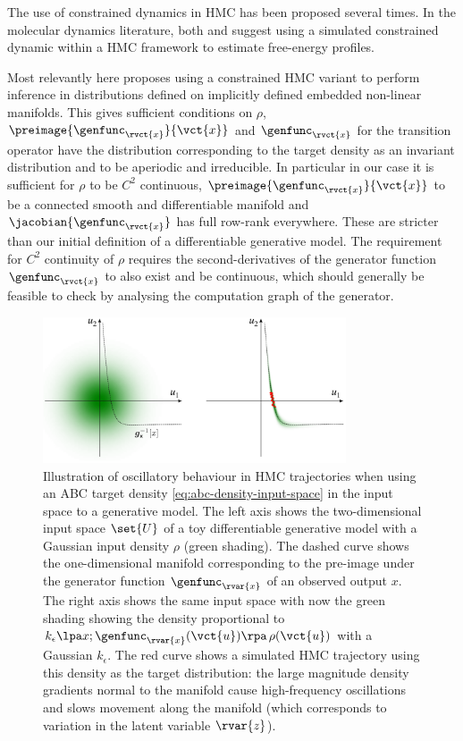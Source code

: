 The use of constrained dynamics in \ac{HMC} has been proposed several times. In the molecular dynamics literature, both \citep{hartmann2005constrained} and \citep{lelievre2012langevin} suggest using a simulated constrained dynamic within a \ac{HMC} framework to estimate free-energy profiles.

Most relevantly here \citep{brubaker2012family} proposes using a constrained \ac{HMC} variant to perform inference in distributions defined on implicitly defined embedded non-linear manifolds. This gives sufficient conditions on $\rho$, $\preimage{\genfunc_{\rvct{x}}}{\vct{x}}$ and $\genfunc_{\rvct{x}}$ for the transition operator have the distribution corresponding to the target density as an invariant distribution and to be aperiodic and irreducible. In particular in our case it is sufficient for $\rho$ to be $C^2$ continuous, $\preimage{\genfunc_{\rvct{x}}}{\vct{x}}$ to be a connected smooth and differentiable manifold and $\jacobian{\genfunc_{\rvct{x}}}$ has full row-rank everywhere. These are stricter than our initial definition of a differentiable generative model. The requirement for $C^2$ continuity of $\rho$ requires the second-derivatives of the generator function $\genfunc_{\rvct{x}}$ to also exist and be continuous, which should generally be feasible to check by analysing the computation graph of the generator.

\begin{figure}[!t]
\centering
\includegraphics[width=0.8\textwidth]{images/gaussian-abc-with-hmc-trajectory-gray}
\caption[Oscillatory Hamiltonian trajectory example.]{Illustration of oscillatory behaviour in \ac{HMC} trajectories when using an \ac{ABC} target density \eqref{eq:abc-density-input-space} in the input space to a generative model. The left axis shows the two-dimensional input space $\set{U}$ of a toy differentiable generative model with a Gaussian input density $\rho$ (green shading). The dashed curve shows the one-dimensional manifold corresponding to the pre-image under the generator function $\genfunc_{\rvar{x}}$ of an observed output $x$. The right axis shows the same input space with now the green shading showing the density proportional to $k_\epsilon\lpa x; \genfunc_{\rvar{x}}(\vct{u})\rpa \,\rho(\vct{u})$ with a Gaussian $k_\epsilon$. The red curve shows a simulated \ac{HMC} trajectory using this density as the target distribution: the large magnitude density gradients normal to the manifold cause high-frequency oscillations and slows movement along the manifold (which corresponds to variation in the latent variable $\rvar{z}$).}
\label{fig:gaussian-abc-hmc-trajectory-example}
\end{figure}

